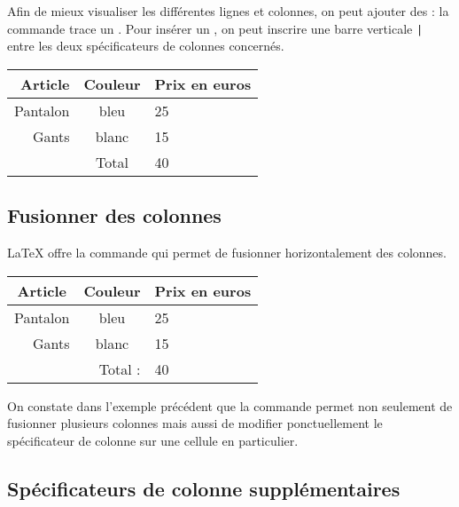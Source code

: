 Afin de mieux visualiser les différentes lignes et colonnes, on peut ajouter des  : la commande  trace un .
Pour insérer un , on peut inscrire une barre verticale \verb!|! entre les deux spécificateurs de colonnes concernés.\bigskip

{\NewFont
\begin{SideBySideExample}
    \begin{tabular}{r||c|l}
        Article & Couleur & Prix en euros \\ \hline\hline
        Pantalon & bleu & 25 \\
        Gants & blanc & 15 \\ \hline
          & Total & 40
    \end{tabular}
\end{SideBySideExample}
}

\subsection{Fusionner des colonnes}

\LaTeX{} offre la commande  qui permet de fusionner horizontalement des colonnes.\bigskip

{\NewFont
\begin{SideBySideExample}
    \begin{tabular}{r|c|l}
        \multicolumn{1}{c|}{Article} &
        Couleur & Prix en euros \\ \hline
        Pantalon & bleu & 25 \\
        Gants & blanc & 15 \\ \hline
        \multicolumn{2}{r}{Total :} & 40
    \end{tabular}
\end{SideBySideExample}
}\bigskip

\begin{info}
    On constate dans l'exemple précédent que la commande  permet non seulement de fusionner plusieurs colonnes mais aussi de modifier ponctuellement le spécificateur de colonne sur une cellule en particulier.
\end{info}

\subsection{Spécificateurs de colonne supplémentaires}

